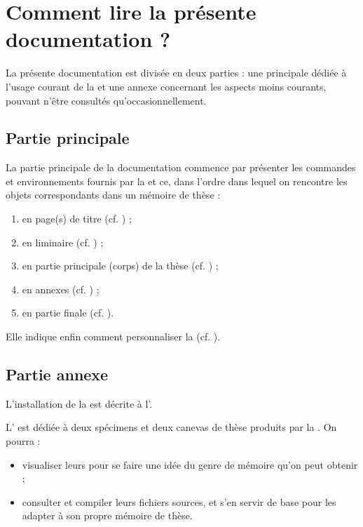 \section{Comment lire la présente documentation ?}
\label{sec-comment-lire-cette}

La présente documentation est divisée en deux parties : une principale dédiée
à l'usage courant de la \yatCl{} et une annexe concernant les aspects moins
courants, pouvant n'être consultés qu'occasionnellement.

\subsection{Partie principale}
\label{sec-partie-principale}

La partie principale de la documentation commence par présenter les commandes et
environnements fournis par la \yatCl{} et ce, dans l'ordre dans lequel on
rencontre les objets correspondants dans un mémoire de thèse :
\begin{enumerate}
\item en page(s) de titre (cf. ) ;
\item en \gls{liminaire} (cf. ) ;
\item en partie principale (corps) de la thèse (cf. ) ;
\item en annexes (cf. ) ;
\item en partie finale (cf. ).
\end{enumerate}
Elle indique enfin comment personnaliser la \yatCl{}
(cf. ).

\subsection{Partie annexe}
\label{sec-partie-annexe}

L'installation de la \yatCl{} est décrite à l'.

L' est dédiée à deux spécimens et deux canevas de
thèse produits par la \yatCl{}. On pourra :
\begin{itemize}
\item visualiser leurs  pour se faire une idée du genre de
  mémoire qu'on peut obtenir ;
\item consulter et compiler leurs fichiers sources, et s'en servir de base pour
  les adapter à son propre mémoire de thèse.
\end{itemize}

